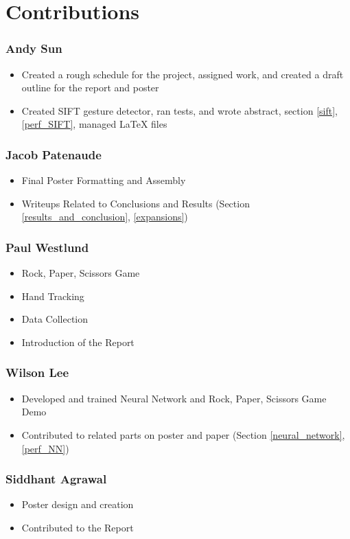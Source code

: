 \section{Contributions}

\subsubsection*{Andy Sun}
\begin{itemize}
\item Created a rough schedule for the project, assigned work, and created a draft outline for the report and poster
\item Created SIFT gesture detector, ran tests, and wrote abstract, section \ref{sift}, \ref{perf_SIFT}, managed \LaTeX{} files
\end{itemize}

\subsubsection*{Jacob Patenaude}
\begin{itemize}
\item Final Poster Formatting and Assembly
\item Writeups Related to Conclusions and Results (Section \ref{results_and_conclusion}, \ref{expansions})
\end{itemize}

\subsubsection*{Paul Westlund}
\begin{itemize}
\item Rock, Paper, Scissors Game
\item Hand Tracking
\item Data Collection
\item Introduction of the Report
\end{itemize}

\subsubsection*{Wilson Lee}
\begin{itemize}
\item Developed and trained Neural Network and Rock, Paper, Scissors Game Demo
\item Contributed to related parts on poster and paper (Section \ref{neural_network}, \ref{perf_NN})
\end{itemize}

\subsubsection*{Siddhant Agrawal}
\begin{itemize}
\item Poster design and creation
\item Contributed to the Report
\end{itemize}
